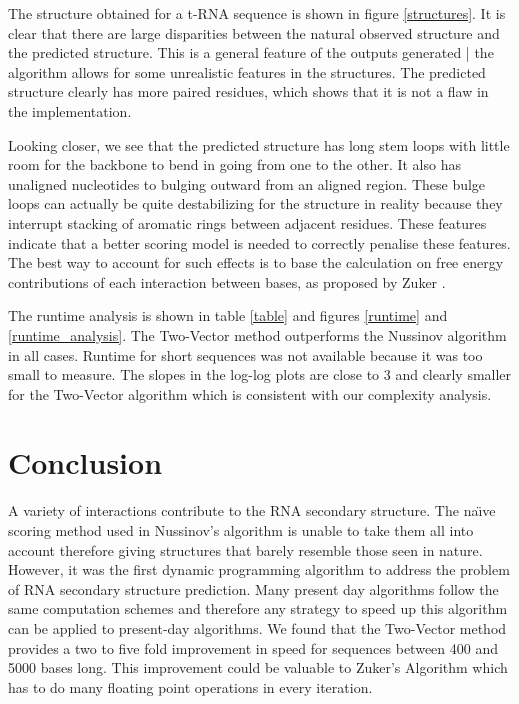 \documentclass[journal]{IEEEtran}
\begin{document}
The structure obtained for a t-RNA sequence is shown in figure \ref{structures}. It is clear that there are large disparities between the natural observed structure and the predicted structure. This is a general feature of the outputs generated | the algorithm allows for some unrealistic features in the structures. The predicted structure clearly has more paired residues, which shows that it is not a flaw in the implementation.

Looking closer, we see that the predicted structure has long stem loops with little room for the backbone to bend in going from one to the other. It also has unaligned nucleotides to bulging outward from an aligned region. These bulge loops can actually be quite destabilizing for the structure in reality because they interrupt stacking of aromatic rings between adjacent residues. These features indicate that a better scoring model is needed to correctly penalise these features. The best way to account for such effects is to base the calculation on free energy contributions of each interaction between bases, as proposed by Zuker \cite{zuker}.

The runtime analysis is shown in table \ref{table} and figures \ref{runtime} and \ref{runtime_analysis}. The Two-Vector method outperforms the Nussinov algorithm in all cases. Runtime for short sequences was not available because it was too small to measure. The slopes in the log-log plots are close to 3 and clearly smaller for the Two-Vector algorithm which is consistent with our complexity analysis.




\section{Conclusion}
A variety of interactions contribute to the RNA secondary structure. The na\"{\i}ve scoring method used in Nussinov's algorithm is unable to take them all into account therefore giving structures that barely resemble those seen in nature. However, it was the first dynamic programming algorithm to address the problem of RNA secondary structure prediction. Many present day algorithms follow the same computation schemes and therefore any strategy to speed up this algorithm can be applied to present-day algorithms. We found that the Two-Vector method provides a two to five fold improvement in speed for sequences between 400 and 5000 bases long. This improvement could be valuable to Zuker's Algorithm which has to do many floating point operations in every iteration.
\end{document}
